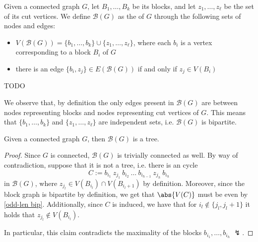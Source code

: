 \documentclass[a4paper, 12pt]{report}
\begin{document}
    \begin{frameddefn}{}
        Given a connected graph $G$, let $B_1, \ldots, B_k$ be its blocks, and let $z_1, \ldots, z_\ell$ be the set of its cut vertices. We define $\mathcal B(G)$ as the  of $G$ through the following sets of nodes and edges:

        \begin{itemize}
            \item $V(\mathcal B(G)) = \{b_1, \ldots, b_k\} \cup \{z_1, \ldots, z_\ell\}$, where each $b_i$ is a vertex corresponding to a block $B_i$ of $G$
            \item there is an edge $\{b_i, z_j\} \in E(\mathcal B(G))$ if and only if $z_j \in V(B_i)$
        \end{itemize}
    \end{frameddefn}

    TODO 

    We observe that, by definition the only edges present in $\mathcal B(G)$ are between nodes representing blocks and nodes representing cut vertices of $G$. This means that $\{b_1, \ldots, b_k\}$ and $\{z_1, \ldots, z_\ell\}$ are independent sets, i.e. $\mathcal B(G)$ is bipartite.

    \begin{framedthm}{}
        Given a connected graph $G$, then $\mathcal B(G)$ is a tree.
    \end{framedthm}

    \begin{proof}
        Since $G$ is connected, $\mathcal B(G)$ is trivially connected as well. By way of contradiction, suppose that it is not a tree, i.e. there is an  cycle $$C := b_{i_1} \ z_{j_1} \ b_{i_2} \ \ldots \ b_{i_{h - 1}} \ z_{j_h} \ b_{i_h} $$ in $\mathcal B(G)$, where $z_{j_l} \in V(B_{i_l}) \cap V(B_{{i_l} + 1})$ by definition. Moreover, since the block graph is bipartite by definition, we get that $\abs{V(C)}$ must be even by \cref{odd-len bip}. Additionally, since $C$ is induced, we have that for $i_l \notin \{j_l, j_l + 1\}$ it holds that $z_{j_l} \notin V(B_{i_l})$.


        In particular, this claim contradicts the maximality of the blocks $b_{i_1}, \ldots, b_{i_h}$ $\lightning$.
    \end{proof}
\end{document}

